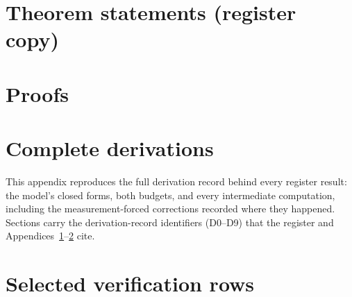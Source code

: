 \documentclass{article}
\begin{document}
\section{Theorem statements (register copy)}
\label{app:theorems}


\section{Proofs}
\label{app:proofs}


\section{Complete derivations}
\label{app:derivations}

This appendix reproduces the full derivation record behind every register
result: the model's closed forms, both budgets, and every intermediate
computation, including the measurement-forced corrections recorded where
they happened. Sections carry the derivation-record identifiers (D0--D9)
that the register and Appendices~\ref{app:theorems}--\ref{app:proofs}
cite.



\section{Selected verification rows}
\label{app:table}
\end{document}
